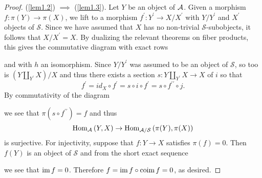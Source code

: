 \documentclass[dissertation.tex]{subfiles}
\begin{document}
\begin{lem}
\begin{proof}
    (\ref{lem1.2}) $\implies$ (\ref{lem1.3}).  Let $Y$ be an object of $\mathcal{A}$.
    Given a morphism $f : \pi(Y) \rightarrow \pi(X)$, we lift to a morphism $f^\prime \colon Y^\prime \rightarrow X/X^\prime$ with $Y/Y^\prime$ and $X^\prime$ objects of $\mathcal{S}$.
    Since we have assumed that $X$ has no non-trivial $\mathcal{S}$-subobjects, it follows that $X/X^\prime = X$.
    By dualizing the relevant theorems on fiber products, this gives the commutative diagram with exact rows
    \begin{center}
    \end{center}
    and with $h$ an isomorphism.
    Since $Y/Y^\prime$ was assumed to be an object of $\mathcal{S}$, so too is $\left(Y \coprod_{Y^\prime} X\right)/X$ and thus there exists a section $s : Y \coprod_{Y^\prime} X \rightarrow X$ of $i$ so that
    $$f^\prime = id_X \circ f^\prime = s\circ i \circ f^\prime = s \circ f^{\prime\prime} \circ j.$$
    By commutativity of the diagram
    \begin{center}
    \end{center}
    we see that $\pi(s \circ f^{\prime\prime}) = f$ and thus
    $$\operatorname{Hom}_{\mathcal{A}}\left(Y,X\right) \rightarrow \operatorname{Hom}_{\mathcal{A}/\mathcal{S}}\left(\pi(Y), \pi(X)\right)$$
    is surjective.
    For injectivity, suppose that $f \colon Y \rightarrow X$ satisfies $\pi(f) = 0$.
    Then $f(Y)$ is an object of $\mathcal{S}$ and from the short exact sequence
    \begin{center}
    \end{center}
    we see that $\operatorname{im}{f} = 0$.
    Therefore $f = \operatorname{im}{f} \circ \operatorname{coim}{f} = 0$, as desired.
    

\end{proof}
\end{lem}
\end{document}
